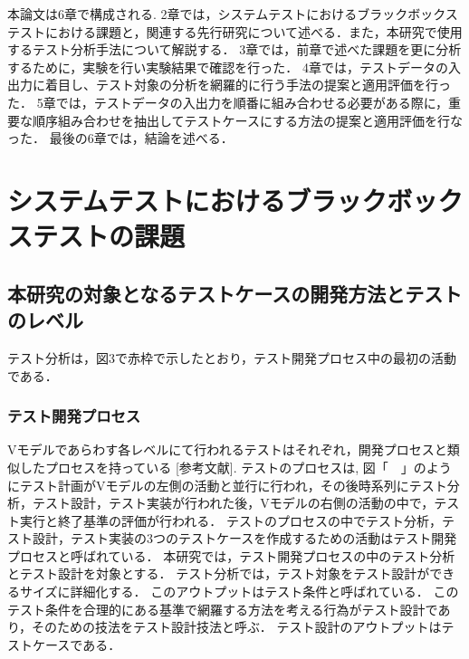 \documentclass[a4paper,11pt]{jreport}
\begin{document}
本論文は6章で構成される.
2章では，システムテストにおけるブラックボックステストにおける課題と，関連する先行研究について述べる．また，本研究で使用するテスト分析手法について解説する．
3章では，前章で述べた課題を更に分析するために，実験を行い実験結果で確認を行った．
4章では，テストデータの入出力に着目し、テスト対象の分析を網羅的に行う手法の提案と適用評価を行った．
5章では，テストデータの入出力を順番に組み合わせる必要がある際に，重要な順序組み合わせを抽出してテストケースにする方法の提案と適用評価を行なった．
最後の6章では，結論を述べる．

\chapter{システムテストにおけるブラックボックステストの課題}
\section{本研究の対象となるテストケースの開発方法とテストのレベル}
テスト分析は，図3で赤枠で示したとおり，テスト開発プロセス中の最初の活動である．
\subsection{テスト開発プロセス}
Vモデルであらわす各レベルにて行われるテストはそれぞれ，開発プロセスと類似したプロセスを持っている [参考文献].
テストのプロセスは, 図「　」のようにテスト計画がVモデルの左側の活動と並行に行われ，その後時系列にテスト分析，テスト設計，テスト実装が行われた後，Vモデルの右側の活動の中で，テスト実行と終了基準の評価が行われる．
テストのプロセスの中でテスト分析，テスト設計，テスト実装の3つのテストケースを作成するための活動はテスト開発プロセスと呼ばれている\cite{ISTQB}．
本研究では，テスト開発プロセスの中のテスト分析とテスト設計を対象とする．
テスト分析では，テスト対象をテスト設計ができるサイズに詳細化する．
このアウトプットはテスト条件と呼ばれている．
このテスト条件を合理的にある基準で網羅する方法を考える行為がテスト設計であり，そのための技法をテスト設計技法と呼ぶ．
テスト設計のアウトプットはテストケースである．
\end{document}

